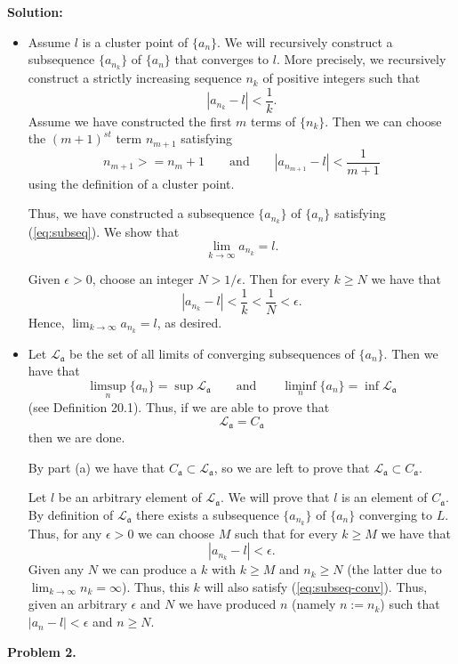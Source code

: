 \documentclass[12pt]{article}
\def\black{\color{black}}
\def\green{\color{rltgreen}}
\newcommand\bi{\begin{itemize}}
\newcommand\ei{\end{itemize}}
\newcommand\itema{\item[(a)]}
\newcommand\itemb{\item[(b)]}
\renewcommand\and{\qquad\text{and}\qquad}
\renewcommand\|{\ | \ }
\newcommand\ra{\rightarrow}
\newcommand\mf\mathfrak
\newcommand\mc\mathcal
\def\pb#1{{\green \bf Problem #1.}\hskip 8pt \black}
\def\sol{\textbf{Solution:}}
\newcommand\mfa{\mf a}
\def\sequence#1{$\{{#1}_n\}$}
\def\subsequence#1{$\{{#1}_{n_k}\}$}
\newcommand\e\epsilon
\newcommand\foranyeps{for any $\epsilon > 0$ }
\newcommand\foreveryk{for every $k \geq N$ }
\begin{document}
\sol

\bi
\itema
Assume $l$ is a cluster point of \sequence a. We will recursively construct
a subsequence \subsequence a of \sequence a that converges to $l$.
More precisely, we recursively construct a strictly increasing sequence $n_k$
of positive integers such that
\begin{equation}
\label{eq:subseq}
|a_{n_k} - l| < \frac 1 k.
\end{equation}
Assume we have constructed the first $m$ terms of $\{n_k\}$. Then
we can choose the $(m+1)^{st}$ term $n_{m+1}$ satisfying
\[
n_{m+1} >= n_m + 1 \and |a_{n_{m+1}} - l| < \frac 1 {m+1}
\]
using the definition of a cluster point.

Thus, we have constructed a subsequence \subsequence a of \sequence a
satisfying (\ref{eq:subseq}). We show that 
\[
\lim_{k \ra \infty} a_{n_k} = l.
\]

Given $\epsilon > 0$, choose an integer $N > 1 / \epsilon$. Then
\foreveryk we have that 
\[
|a_{n_k} - l| < \frac 1 k < \frac 1 N < \epsilon.
\]
Hence, $\lim_{k \ra \infty} a_{n_k} = l$, as desired.
\itemb
Let $\mc L_\mfa$ be the set of all limits of converging subsequences
of \sequence a. Then we have that
\[
\limsup_n \{a_n\} = \sup \mc L_\mfa \and
\liminf_n \{a_n\} = \inf \mc L_\mfa
\]
(see Definition 20.1). Thus, if we are able to prove that 
\[
\mc L_\mfa = C_\mfa
\]
then we are done.

By part (a) we have that $C_\mfa \subset \mc L_\mfa$, so we are left to prove 
that $\mc L_\mfa \subset C_\mfa$.

Let $l$ be an arbitrary element of $\mc L_\mfa$. We will prove that $l$ 
is an element of $C_\mfa$. By definition of 
$\mc L_\mfa$ there exists a subsequence \subsequence a of \sequence a
converging to $L$. Thus, \foranyeps we can choose $M$ such that 
for every $k \geq M$ we have that 
\begin{equation}
\label{eq:subseq-conv}
|a_{n_k} - l| < \e.
\end{equation}
Given any $N$ we can produce a $k$ with $k \geq M$ and
$n_k \geq N$ (the latter due to $\lim_{k\ra \infty} n_k = \infty$). Thus,
this $k$ will also satisfy (\ref{eq:subseq-conv}). Thus, given an arbitrary
$\epsilon$ and $N$ we have produced $n$ (namely $n := n_k$) such that 
$|a_n - l| < \e$ and $n \geq N$.
\ei

\pb 2
\end{document}
